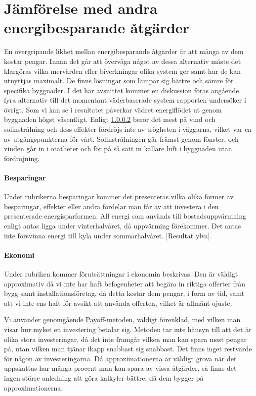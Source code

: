 \section{Jämförelse med andra energibesparande åtgärder}

En övergripande likhet mellan energibesparande åtgärder är att många av dem kostar pengar. Innan det går att överväga något av dessa alternativ måste det klargöras vilka mervärden eller biverkningar olika system ger samt hur de kan utnyttjas maximalt. De finns lösningar som lämpar sig bättre och sämre för specifika byggnader. I det här avsnittet kommer en diskussion föras angående fyra alternativ till det momentant väderbaserade system rapporten undersöker i övrigt.
Som vi kan se i resultatet påverkar vädret energiflödet ut genom byggnaden högst väsentligt. Enligt \ref{} beror det mest på vind och solinstrålning och dess effekter fördröjs inte av trögheten i väggarna, vilket var en av utgångspunkterna för vårt. Solinstrålningen går främst genom fönster, och vinden går in i otätheter och för på så sätt in kallare luft i byggnaden utan fördröjning.

\paragraph{Besparingar}
Under rubrikerna besparingar kommer det presenteras vilka olika former av besparingar, effekter eller andra fördelar man får av att investera i den presenterade energisparformen. All energi som används till bostadsuppvärmning enligt \cite{energideklaration} antas ligga under vinterhalvåret, då uppvärming förekommer. Det antas inte försvinna energi till kyla under sommarhalvåret.  [Resultat ylva].

\paragraph{Ekonomi}
Under rubriken kommer förutsättningar i ekonomin beskrivas. Den är väldigt approximativ då vi inte har haft befogenheter att begära in riktiga offerter från bygg samt installationsföretag, då detta kostar dem pengar, i form av tid, samt att vi inte ens haft för avsikt att använda offerten, vilket är allmänt ojuste.

Vi använder genomgående Payoff-metoden, väldigt förenklad, med vilken man visar hur myket en investering betalar sig. Metoden tar inte hänsyn till att det är olika stora investeringar, då det inte framgår vilken man kan spara mest pengar på, utan vilken man tjänar ikapp snabbast sig snabbast. Det finns inget restvärde för någon av investeringarna. Då approximationerna är väldigt grova när det uppskattas hur många procent man kan spara av vissa åtgärder, så finns det ingen större anledning att göra kalkyler bättre, då dem bygger på approximationerna.
\begin{equation}

\end{equation}


